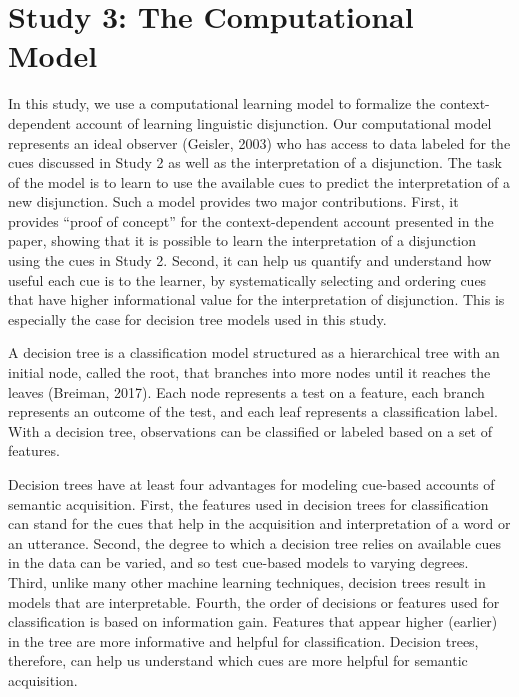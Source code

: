 \documentclass[
  english,
  ,man,floatsintext]{apa6}
\begin{document}
\hypertarget{study-3-the-computational-model}{%
\section{Study 3: The Computational Model}\label{study-3-the-computational-model}}

In this study, we use a computational learning model to formalize the context-dependent account of learning linguistic disjunction. Our computational model represents an ideal observer (Geisler, 2003) who has access to data labeled for the cues discussed in Study 2 as well as the interpretation of a disjunction. The task of the model is to learn to use the available cues to predict the interpretation of a new disjunction. Such a model provides two major contributions. First, it provides ``proof of concept'' for the context-dependent account presented in the paper, showing that it is possible to learn the interpretation of a disjunction using the cues in Study 2. Second, it can help us quantify and understand how useful each cue is to the learner, by systematically selecting and ordering cues that have higher informational value for the interpretation of disjunction. This is especially the case for decision tree models used in this study.

A decision tree is a classification model structured as a hierarchical tree with an initial node, called the root, that branches into more nodes until it reaches the leaves (Breiman, 2017). Each node represents a test on a feature, each branch represents an outcome of the test, and each leaf represents a classification label. With a decision tree, observations can be classified or labeled based on a set of features.

Decision trees have at least four advantages for modeling cue-based accounts of semantic acquisition. First, the features used in decision trees for classification can stand for the cues that help in the acquisition and interpretation of a word or an utterance. Second, the degree to which a decision tree relies on available cues in the data can be varied, and so test cue-based models to varying degrees. Third, unlike many other machine learning techniques, decision trees result in models that are interpretable. Fourth, the order of decisions or features used for classification is based on information gain. Features that appear higher (earlier) in the tree are more informative and helpful for classification. Decision trees, therefore, can help us understand which cues are more helpful for semantic acquisition.
\end{document}

